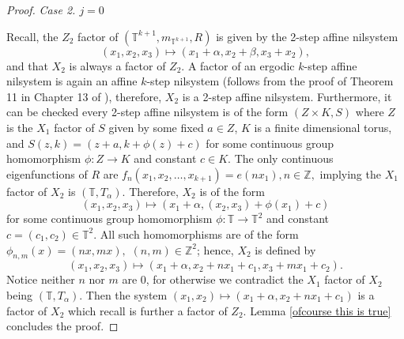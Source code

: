 \documentclass[12pt]{amsart}
\theoremstyle{definition}
\theoremstyle{plain}
\theoremstyle{definition}
\numberwithin{equation}{section}
\begin{document}
\begin{proof}
  \textit{ Case 2. $j=0$}

  Recall, the $Z_2$ factor of $(\mathbb{T}^{k+1},m_{\mathbb{T}^{k+1}},R)$ is given by the 2-step affine nilsystem $$(x_1,x_2,x_3) \mapsto (x_1+\alpha,x_2+\beta,x_3+x_2),$$ and that $X_2$ is always a factor of $Z_2$. A factor of an ergodic $k$-step affine nilsystem is again an affine $k$-step nilsystem (follows from the proof of Theorem 11 in Chapter 13 of \cite{HK2}), therefore, $X_2$ is a 2-step affine nilsystem. Furthermore, it can be checked every 2-step affine nilsystem is of the form $(Z \times K, S)$ where $Z$ is the $X_1$ factor of $S$ given by some fixed $a\in Z$, $K$ is a finite dimensional torus, and $S(z,k)=(z+a, k+\phi(z)+c)$ for some continuous group homomorphism $\phi\colon Z \rightarrow K$ and constant $c\in K$. The only continuous eigenfunctions of $R$ are $f_n(x_1,x_2,\dots,x_{k+1})=e(nx_1),n\in \mathbb{Z},$ implying the $X_1$ factor of $X_2$ is $(\mathbb{T},T_{\alpha})$. Therefore, $X_2$ is of the form $$(x_1,x_2,x_3)\mapsto (x_1+\alpha,(x_2,x_3)+\phi(x_1)+c)$$ for some continuous group homomorphism $\phi\colon\mathbb{T} \rightarrow \mathbb{T}^{2}$ and constant $c=(c_1,c_2)\in \mathbb{T}^2.$ 
  All such homomorphisms are of the form $\phi_{n,m}(x)=(nx,mx),$ $ (n,m) \in \mathbb{Z}^2$; hence, $X_2$ is defined by $$(x_1,x_2,x_3) \mapsto (x_1+\alpha,x_2+nx_1+c_1,x_3+mx_1+c_2).$$ Notice neither $n$ nor $m$ are 0, for otherwise we contradict the $X_1$ factor of $X_2$ being $(\mathbb{T},T_{\alpha})$. Then the system $(x_1,x_2) \mapsto (x_1+\alpha,x_2+nx_1+c_1)$ is a factor of $X_2$ which recall is further a factor of $Z_2$. Lemma \ref{ofcourse this is true} concludes the proof. \end{proof}
\end{document}
